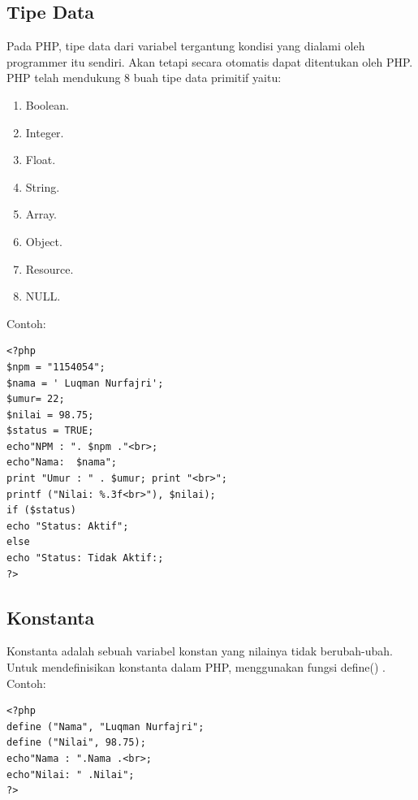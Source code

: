 \subsection{Tipe Data}
Pada PHP, tipe data dari variabel tergantung kondisi yang dialami oleh programmer itu sendiri. Akan tetapi secara otomatis dapat ditentukan oleh PHP. PHP telah mendukung 8 buah tipe data primitif yaitu:
\begin{enumerate}
\item Boolean.
\item Integer.
\item Float.
\item String.
\item Array.
\item Object.
\item Resource.
\item NULL.
\end{enumerate}
Contoh:
\begin{lstlisting}
<?php
$npm = "1154054";
$nama = ' Luqman Nurfajri';
$umur= 22;
$nilai = 98.75;
$status = TRUE;
echo"NPM : ". $npm ."<br>;
echo"Nama:  $nama";
print "Umur : " . $umur; print "<br>";
printf ("Nilai: %.3f<br>"), $nilai);
if ($status)
echo "Status: Aktif";
else
echo "Status: Tidak Aktif:;
?>
\end{lstlisting}

\subsection{Konstanta}
Konstanta adalah sebuah variabel konstan yang nilainya tidak berubah-ubah. Untuk mendefinisikan konstanta dalam PHP, menggunakan fungsi define() .
Contoh:
\begin{lstlisting}
<?php
define ("Nama", "Luqman Nurfajri";
define ("Nilai", 98.75);
echo"Nama : ".Nama .<br>;
echo"Nilai: " .Nilai";
?>
\end{lstlisting}



